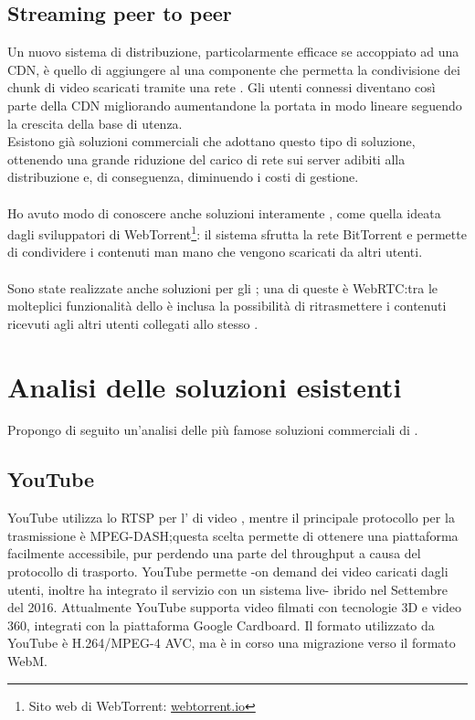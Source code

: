 	\subsection{Streaming peer to peer}
	Un nuovo sistema di distribuzione, particolarmente efficace se accoppiato ad una \gls{CDN}, è quello di aggiungere al  una componente che permetta la condivisione dei chunk di video scaricati tramite una rete . Gli utenti connessi diventano così parte della \gls{CDN} migliorando aumentandone la portata in modo lineare seguendo la crescita della base di utenza.
	\\
	Esistono già soluzioni commerciali che adottano questo tipo di soluzione, ottenendo una grande riduzione del carico di rete sui server adibiti alla distribuzione e, di conseguenza, diminuendo i costi di gestione.
	\paragraph*{}
	Ho avuto modo di conoscere anche soluzioni interamente , come quella ideata dagli sviluppatori di WebTorrent\footnote{Sito web di WebTorrent: \href{https://webtorrent.io/}{webtorrent.io}}: il sistema sfrutta la rete BitTorrent e permette di condividere i contenuti man mano che vengono scaricati da altri utenti.
	\paragraph*{}
	Sono state realizzate anche soluzioni  per gli  ; una di queste è WebRTC:\@ tra le molteplici funzionalità dello  è inclusa la possibilità di ritrasmettere i contenuti ricevuti agli altri utenti collegati allo stesso .

	\section{Analisi delle soluzioni esistenti}
	Propongo di seguito un'analisi delle più famose soluzioni commerciali di .
		\subsection{YouTube}
		YouTube utilizza lo  \gls{RTSP} per l' di  video , mentre il principale protocollo per la trasmissione è MPEG-DASH;\@ questa scelta permette di ottenere una piattaforma facilmente accessibile, pur perdendo una parte del throughput a causa del protocollo di trasporto. YouTube permette -on demand dei video caricati dagli utenti, inoltre ha integrato il servizio con un sistema live- ibrido nel Settembre del 2016. Attualmente YouTube supporta video filmati con tecnologie 3D e video 360\textdegree, integrati con la piattaforma Google Cardboard. Il formato  utilizzato da YouTube è H.264/MPEG-4 AVC, ma è in corso una migrazione verso il formato WebM.
